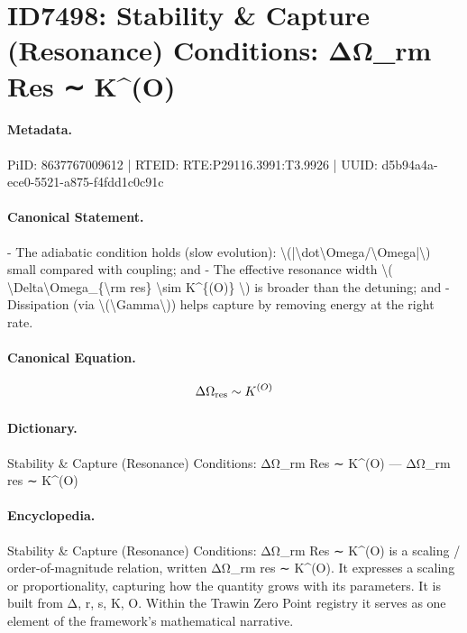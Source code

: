 \section*{ID7498: Stability \& Capture (Resonance) Conditions: ΔΩ\_rm Res ∼ K\textasciicircum{}(O)}
\paragraph{Metadata.}
PiID: 8637767009612 | RTEID: RTE:P29116.3991:T3.9926 | UUID: d5b94a4a-ece0-5521-a875-f4fdd1c0c91c

\paragraph{Canonical Statement.}
- The adiabatic condition holds (slow evolution): \textbackslash{}(|\textbackslash{}dot\textbackslash{}Omega/\textbackslash{}Omega|\textbackslash{}) small compared with coupling; and - The effective resonance width \textbackslash{}( \textbackslash{}Delta\textbackslash{}Omega\_\{\textbackslash{}rm res\} \textbackslash{}sim K\textasciicircum{}\{(O)\} \textbackslash{}) is broader than the detuning; and - Dissipation (via \textbackslash{}(\textbackslash{}Gamma\textbackslash{})) helps capture by removing energy at the right rate.

\paragraph{Canonical Equation.}
\[
\Delta\Omega_{\rm res} \sim K^{(O)}
\]

\paragraph{Dictionary.}
Stability \& Capture (Resonance) Conditions: ΔΩ\_rm Res ∼ K\textasciicircum{}(O) — ΔΩ\_rm res ∼ K\textasciicircum{}(O)

\paragraph{Encyclopedia.}
Stability \& Capture (Resonance) Conditions: ΔΩ\_rm Res ∼ K\textasciicircum{}(O) is a scaling / order-of-magnitude relation, written ΔΩ\_rm res ∼ K\textasciicircum{}(O). It expresses a scaling or proportionality, capturing how the quantity grows with its parameters. It is built from Δ, r, s, K, O. Within the Trawin Zero Point registry it serves as one element of the framework's mathematical narrative.
